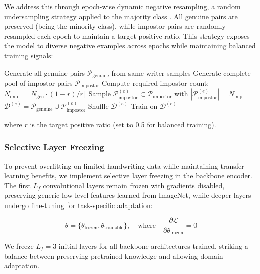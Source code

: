 We address this through epoch-wise dynamic negative resampling, a random undersampling
strategy applied to the majority class \cite{he2009imbalanced}. All genuine pairs are
preserved (being the minority class), while impostor pairs are randomly resampled each
epoch to maintain a target positive ratio. This strategy exposes the model to diverse
negative examples across epochs while maintaining balanced training signals:

\begin{algorithm}[H]
\caption{Dynamic Negative Sampling Strategy}
\begin{algorithmic}[1]
\State Generate all genuine pairs $\mathcal{P}_{\text{genuine}}$ from same-writer samples
\State Generate complete pool of impostor pairs $\mathcal{P}_{\text{impostor}}$
\State Compute required impostor count: $N_{\text{imp}} = \lfloor N_{\text{gen}} \cdot (1-r)/r \rfloor$
    \State Sample $\mathcal{P}_{\text{impostor}}^{(e)} \subset \mathcal{P}_{\text{impostor}}$ with $|\mathcal{P}_{\text{impostor}}^{(e)}| = N_{\text{imp}}$
    \State $\mathcal{D}^{(e)} = \mathcal{P}_{\text{genuine}} \cup \mathcal{P}_{\text{impostor}}^{(e)}$
    \State Shuffle $\mathcal{D}^{(e)}$
    \State Train on $\mathcal{D}^{(e)}$
\EndFor
\end{algorithmic}
\end{algorithm}

where $r$ is the target positive ratio (set to 0.5 for balanced training).

\subsubsection{Selective Layer Freezing}

To prevent overfitting on limited handwriting data while maintaining transfer learning benefits, 
we implement selective layer freezing in the backbone encoder. The first $L_f$ convolutional 
layers remain frozen with gradients disabled, preserving generic low-level features learned from ImageNet, 
while deeper layers undergo fine-tuning for task-specific adaptation:

\begin{equation}
\theta = \{\theta_{\text{frozen}}, \theta_{\text{trainable}}\}, \quad \text{where} \quad \frac{\partial \mathcal{L}}{\partial \theta_{\text{frozen}}} = 0
\end{equation}

We freeze $L_f = 3$ initial layers for all backbone architectures trained, striking a balance between preserving pretrained knowledge and allowing 
domain adaptation.

